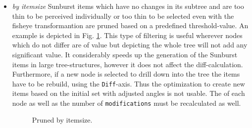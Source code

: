 \begin{itemize}
\item \emph{by itemsize} Sunburst items which have no changes in its subtree and are too thin to be perceived individually or too thin to be selected even with the fisheye transformantion are pruned based on a predefined threshold-value. An example is depicted in Fig. \ref{fig:pruned-by-itemsize}. This type of filtering is useful wherever nodes which do not differ are of value but depicting the whole tree will not add any significant value. It considerably speeds up the generation of the Sunburst items in large tree-structures, however it does not affect the diff-calculation. Furthermore, if a new node is selected to drill down into the tree the items have to be rebuild, using the \texttt{Diff}-axis. Thus the optimization to create new items based on the initial set with adjusted angles is not usable. The  of each node as well as the number of \texttt{modifications} must be recalculated as well. 

\begin{figure}[tb]
\caption{\label{fig:pruned-by-itemsize} Pruned by itemsize.}
\end{figure}


\end{itemize}
